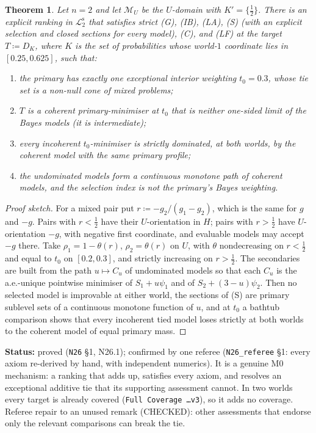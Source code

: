 \documentclass[11pt]{article}
\newtheorem{theorem}{Theorem}[section]
\theoremstyle{definition}
\theoremstyle{remark}
\newcommand{\M}{\mathcal M}
\newcommand{\src}[1]{\texttt{#1}}
\newcommand{\status}[1]{\par\smallskip\noindent\textbf{Status:} #1\par\smallskip}
\newcommand{\Ltwo}{\mathcal L_2^{\mathrm s}}
\begin{document}
\begin{theorem}\label{thm:N26.1}
Let $n=2$ and let $\M_U$ be the $U$-domain with $K'=\{\tfrac12\}$. There is an explicit ranking in $\Ltwo$ that satisfies strict (G), (IB), (LA), (S) (with an explicit selection and closed sections for every model), (C), and (LF) at the target $T\coloneqq D_K$, where $K$ is the set of probabilities whose world-$1$ coordinate lies in $[0.25,0.625]$, such that:
\begin{enumerate}[leftmargin=*,label=(\alph*)]
\item the primary has exactly one exceptional interior weighting $t_0=0.3$, whose tie set is a non-null cone of mixed problems;
\item $T$ is a coherent primary-minimiser at $t_0$ that is neither one-sided limit of the Bayes models (it is intermediate);
\item every incoherent $t_0$-minimiser is strictly dominated, at both worlds, by the coherent model with the same primary profile;
\item the undominated models form a continuous monotone path of coherent models, and the selection index is not the primary's Bayes weighting.
\end{enumerate}
\end{theorem}
\begin{proof}[Proof sketch]
For a mixed pair put $r\coloneqq-g_2/(g_1-g_2)$, which is the same for $g$ and $-g$. Pairs with $r<\tfrac12$ have their $U$-orientation in $H$; pairs with $r>\tfrac12$ have $U$-orientation $-g$, with negative first coordinate, and evaluable models may accept $-g$ there. Take $\rho_1=1-\theta(r)$, $\rho_2=\theta(r)$ on $U$, with $\theta$ nondecreasing on $r<\tfrac12$ and equal to $t_0$ on $[0.2,0.3]$, and strictly increasing on $r>\tfrac12$. The secondaries are built from the path $u\mapsto C_u$ of undominated models so that each $C_u$ is the a.e.-unique pointwise minimiser of $S_1+u\psi_1$ and of $S_2+(3-u)\psi_2$. Then no selected model is improvable at either world, the sections of (S) are primary sublevel sets of a continuous monotone function of $u$, and at $t_0$ a bathtub comparison shows that every incoherent tied model loses strictly at both worlds to the coherent model of equal primary mass.
\end{proof}
\status{proved (\src{N26} \S1, N26.1); confirmed by one referee (\src{N26\_referee} \S1: every axiom re-derived by hand, with independent numerics). It is a genuine M0 mechanism: a ranking that adds up, satisfies every axiom, and resolves an exceptional additive tie that its supporting assessment cannot. In two worlds every target is already covered (\src{Full Coverage \dots v3}), so it adds no coverage. Referee repair to an unused remark (CHECKED): other assessments that endorse only the relevant comparisons can break the tie.}
\end{document}
